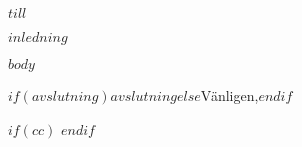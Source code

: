 \documentclass{letter}
\begin{document}
\begin{letter}{$till$}
\opening{$inledning$}

$body$

\closing{$if(avslutning)$$avslutning$$else$Vänligen,$endif$}

$if(cc)$
$endif$
\end{letter}
\end{document}
